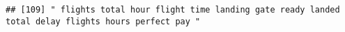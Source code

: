 \documentclass[
]{article}
\begin{document}
\begin{verbatim}
## [109] " flights total hour flight time landing gate ready landed total delay flights hours perfect pay "                                                                                                                                                                                                                                                                                                                                                                                                                                                                                                                                                                                                                                                                                                                                                                                                                                                                                                                                                                                                                                                                                                                                                                                                                                                                                                                                                                                                                                                                                                                                                                                                                                                                                              

\end{verbatim}
\end{document}
